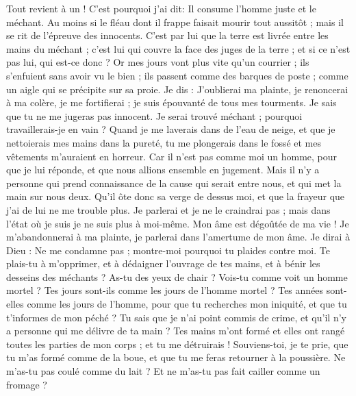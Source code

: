 \begin{multicols}{2}
Tout revient à un ! C'est pourquoi j'ai dit: Il consume l'homme juste et le méchant.
Au moins si le fléau dont il frappe faisait mourir tout aussitôt ; mais il se rit de l'épreuve des innocents. 
C'est par lui que la terre est livrée entre les mains du méchant ; c'est lui qui couvre la face des juges de la terre ; et si ce n'est pas lui, qui est-ce donc ? 
Or mes jours vont plus vite qu'un courrier ; ils s'enfuient sans avoir vu le bien ;
ils passent comme des barques de poste ; comme un aigle qui se précipite sur sa proie.
Je dis : J'oublierai ma plainte, je renoncerai à ma colère, je me fortifierai ; 
je suis épouvanté de tous mes tourments. Je sais que tu ne me jugeras pas innocent.
Je serai trouvé méchant ; pourquoi travaillerais-je en vain ?
Quand je me laverais dans de l'eau de neige, et que je nettoierais mes mains dans la pureté, 
tu me plongerais dans le fossé et mes vêtements m'auraient en horreur.
Car il n'est pas comme moi un homme, pour que je lui réponde, et que nous allions ensemble en jugement.
Mais il n'y a personne qui prend connaissance de la cause qui serait entre nous, et qui met la main sur nous deux.
Qu'il ôte donc sa verge de dessus moi, et que la frayeur que j'ai de lui ne me trouble plus.
Je parlerai et je ne le craindrai pas ; mais dans l'état où je suis je ne suis plus à moi-même. 
\VerseOne{}Mon âme est dégoûtée de ma vie ! Je m'abandonnerai à ma plainte, je parlerai dans l'amertume de mon âme.
Je dirai à Dieu : Ne me condamne pas ; montre-moi pourquoi tu plaides contre moi.
Te plais-tu à m'opprimer, et à dédaigner l'ouvrage de tes mains, et à bénir les desseins des méchants ?
As-tu des yeux de chair ? Vois-tu comme voit un homme mortel ?
Tes jours sont-ils comme les jours de l'homme mortel ? Tes années sont-elles comme les jours de l'homme, 
pour que tu recherches mon iniquité, et que tu t'informes de mon péché ?
Tu sais que je n'ai point commis de crime, et qu'il n'y a personne qui me délivre de ta main ?
Tes mains m'ont formé et elles ont rangé toutes les parties de mon corps ; et tu me détruirais !
Souviens-toi, je te prie, que tu m'as formé comme de la boue, et que tu me feras retourner à la poussière. 
Ne m'as-tu pas coulé comme du lait ? Et ne m'as-tu pas fait cailler comme un fromage ?

\end{multicols}
